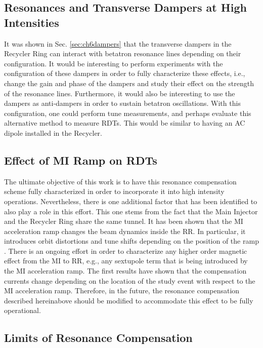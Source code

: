 \subsection{Resonances and Transverse Dampers at High Intensities}

It was shown in Sec. \ref{sec:ch6dampers} that the transverse dampers in the Recycler Ring can interact with betatron resonance lines depending on their configuration. It would be interesting to perform experiments with the configuration of these dampers in order to fully characterize these effects, i.e., change the gain and phase of the dampers and study their effect on the strength of the resonance lines. Furthermore, it would also be interesting to use the dampers as anti-dampers in order to sustain betatron oscillations. With this configuration, one could perform tune measurements, and perhaps evaluate this alternative method to measure RDTs. This would be similar to having an AC dipole installed in the Recycler.  

\subsection{Effect of MI Ramp on RDTs}

The ultimate objective of this work is to have this resonance compensation scheme fully characterized in order to incorporate it into high intensity operations. Nevertheless, there is one additional factor that has been identified to also play a role in this effort. This one stems from the fact that the Main Injector and the Recycler Ring share the same tunnel. It has been shown that the MI acceleration ramp changes the beam dynamics inside the RR. In particular, it introduces orbit distortions and tune shifts depending on the position of the ramp \cite{mionrr}. There is an ongoing effort in order to characterize any higher order magnetic effect from the MI to RR, e.g., any sextupole term that is being introduced by the MI acceleration ramp. The first results have shown that the compensation currents change depending on the location of the study event with respect to the MI acceleration ramp. Therefore, in the future, the resonance compensation described hereinabove should be modified to accommodate this effect to be fully operational.

\subsection{Limits of Resonance Compensation}

